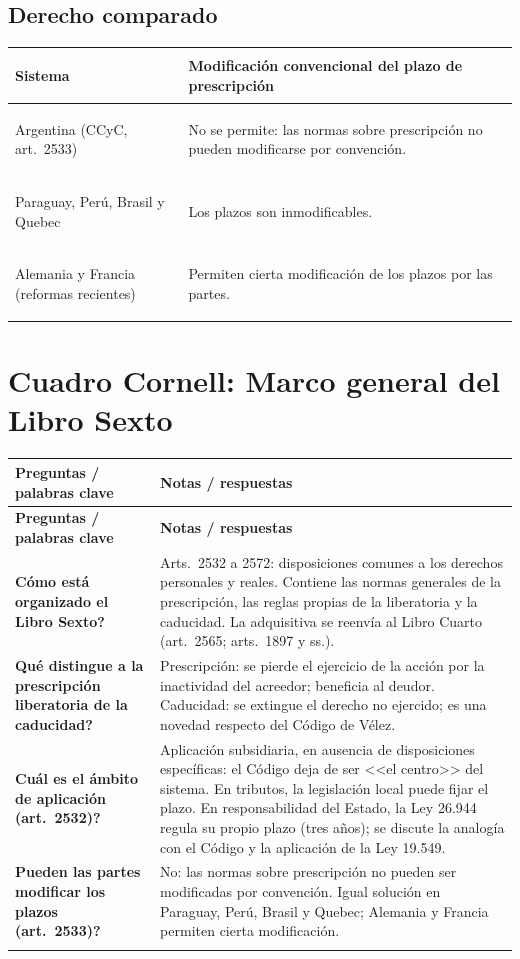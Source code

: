\documentclass[12pt,oneside]{book}
\newenvironment{cornell}{%
  \par\medskip\noindent
  \begin{longtable}{>{\raggedright\arraybackslash}p{0.25\textwidth}>{\raggedright\arraybackslash}p{0.69\textwidth}}
  \toprule
  \textbf{Preguntas / palabras clave} & \textbf{Notas / respuestas} \\
  \midrule
  \endfirsthead
  \toprule
  \textbf{Preguntas / palabras clave} & \textbf{Notas / respuestas} \\
  \midrule
  \endhead
}{%
  \bottomrule
  \end{longtable}
}
\newcommand{\cq}[2]{\textbf{#1} & #2 \\ \addlinespace[0.5em]}
\newcommand{\cresumen}[1]{\midrule \multicolumn{2}{p{0.94\textwidth}}{\textbf{Resumen:} #1} \\}
\begin{document}
\subsection{Derecho comparado}

\begin{table}[H]
\centering\small
\begin{tabularx}{\textwidth}{>{\bfseries\raggedright\arraybackslash}p{5cm}>{\raggedright\arraybackslash}X}
\toprule
Sistema & Modificaci\'on convencional del plazo de prescripci\'on \\
\midrule
Argentina (CCyC, art.\ 2533) & No se permite: las normas sobre prescripci\'on no pueden modificarse por convenci\'on. \\
Paraguay, Per\'u, Brasil y Quebec & Los plazos son inmodificables. \\
Alemania y Francia (reformas recientes) & Permiten cierta modificaci\'on de los plazos por las partes. \\
\bottomrule
\end{tabularx}
\end{table}

\section*{Cuadro Cornell: Marco general del Libro Sexto}

\begin{cornell}
\cq{\textquestiondown C\'omo est\'a organizado el Libro Sexto?}{Arts.\ 2532 a 2572: disposiciones comunes a los derechos personales y reales. Contiene las normas generales de la prescripci\'on, las reglas propias de la liberatoria y la caducidad. La adquisitiva se reenv\'ia al Libro Cuarto (art.\ 2565; arts.\ 1897 y ss.).}
\cq{\textquestiondown Qu\'e distingue a la prescripci\'on liberatoria de la caducidad?}{Prescripci\'on: se pierde el ejercicio de la acci\'on por la inactividad del acreedor; beneficia al deudor. Caducidad: se extingue el derecho no ejercido; es una novedad respecto del C\'odigo de V\'elez.}
\cq{\textquestiondown Cu\'al es el \'ambito de aplicaci\'on (art.\ 2532)?}{Aplicaci\'on subsidiaria, en ausencia de disposiciones espec\'ificas: el C\'odigo deja de ser <<el centro>> del sistema. En tributos, la legislaci\'on local puede fijar el plazo. En responsabilidad del Estado, la Ley 26.944 regula su propio plazo (tres a\~nos); se discute la analog\'ia con el C\'odigo y la aplicaci\'on de la Ley 19.549.}
\cq{\textquestiondown Pueden las partes modificar los plazos (art.\ 2533)?}{No: las normas sobre prescripci\'on no pueden ser modificadas por convenci\'on. Igual soluci\'on en Paraguay, Per\'u, Brasil y Quebec; Alemania y Francia permiten cierta modificaci\'on.}
\cresumen{El Libro Sexto regula la prescripci\'on liberatoria y la caducidad; la adquisitiva se reenv\'ia al Libro Cuarto. El C\'odigo se aplica de manera subsidiaria, ya no es el centro del sistema y sus normas de prescripci\'on son imperativas: los plazos no pueden modificarse por convenci\'on.}
\end{cornell}
\end{document}
